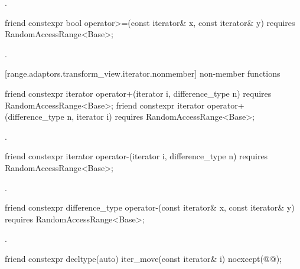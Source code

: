 \begin{itemdescr}
\pnum
\returns {}.
\end{itemdescr}

%
\begin{itemdecl}
friend constexpr bool operator>=(const iterator& x, const iterator& y)
  requires RandomAccessRange<Base>;
\end{itemdecl}

\begin{itemdescr}
\pnum
\returns {}.
\end{itemdescr}

[range.adaptors.transform_view.iterator.nonmember]{ non-member functions}

\begin{itemdecl}
friend constexpr iterator operator+(iterator i, difference_type n)
  requires RandomAccessRange<Base>;
friend constexpr iterator operator+(difference_type n, iterator i)
  requires RandomAccessRange<Base>;
\end{itemdecl}

\begin{itemdescr}
\pnum
\returns {}.
\end{itemdescr}

%
\begin{itemdecl}
friend constexpr iterator operator-(iterator i, difference_type n)
  requires RandomAccessRange<Base>;
\end{itemdecl}

\begin{itemdescr}
\pnum
\returns {}.
\end{itemdescr}

%
\begin{itemdecl}
friend constexpr difference_type operator-(const iterator& x, const iterator& y)
  requires RandomAccessRange<Base>;
\end{itemdecl}

\begin{itemdescr}
\pnum
\returns {}.
\end{itemdescr}

\begin{itemdecl}
friend constexpr decltype(auto) iter_move(const iterator& i)
  noexcept(@\oldtxt{\seebelow}@);
\end{itemdecl}

